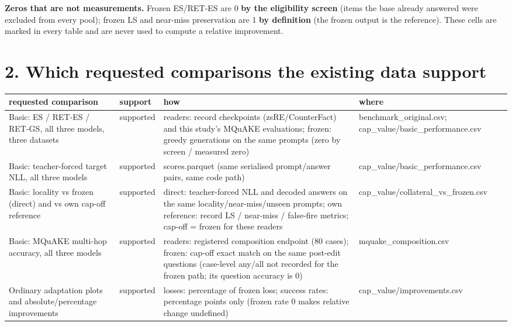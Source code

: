 \documentclass[10pt,a4paper]{article}
\begin{document}
\textbf{Zeros that are not measurements.} Frozen ES/RET-ES are 0 \textbf{by the eligibility screen} (items the base already answered were excluded from every pool); frozen LS and near-miss preservation are 1 \textbf{by definition} (the frozen output is the reference). These cells are marked in every table and are never used to compute a relative improvement.



\section*{2. Which requested comparisons the existing data support}



\begin{center}\footnotesize
\begin{tabularx}{\textwidth}{@{}p{}XXX@{}}
\toprule
requested comparison & support & how & where \\ \midrule
Basic: ES / RET-ES / RET-GS, all three models, three datasets & supported & readers: record checkpoints (zsRE/CounterFact) and this study's MQuAKE evaluations; frozen: greedy generations on the same prompts (zero by screen / measured zero) & benchmark\_original.csv; cap\_value/basic\_performance.csv \\
Basic: teacher-forced target NLL, all three models & supported & scores.parquet (same serialised prompt/answer pairs, same code path) & cap\_value/basic\_performance.csv \\
Basic: locality vs frozen (direct) and vs own cap-off reference & supported & direct: teacher-forced NLL and decoded answers on the same locality/near-miss/unseen prompts; own reference: record LS / near-miss / false-fire metrics; cap-off = frozen for these readers & cap\_value/collateral\_vs\_frozen.csv \\
Basic: MQuAKE multi-hop accuracy, all three models & supported & readers: registered composition endpoint (80 cases); frozen: cap-off exact match on the same post-edit questions (case-level any/all not recorded for the frozen path; its question accuracy is 0) & mquake\_composition.csv \\
Ordinary adaptation plots and absolute/percentage improvements & supported & losses: percentage of frozen loss; success rates: percentage points only (frozen rate 0 makes relative change undefined) & cap\_value/improvements.csv \\

\end{tabularx}
\end{center}
\end{document}
